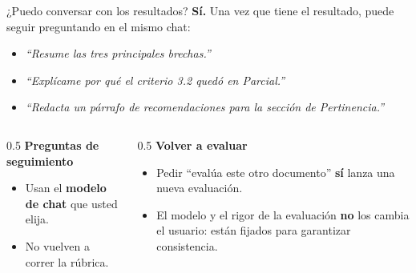 \documentclass[aspectratio=169,11pt]{beamer}
\newcommand{\redlead}[1]{\textbf{\color{iloRed}#1}}
\newcommand{\bluelead}[1]{\textbf{\color{iloBlue}#1}}
\begin{document}
\begin{frame}{¿Puedo conversar con los resultados?}
  \small
  \redlead{Sí.} Una vez que tiene el resultado, puede seguir preguntando en el mismo chat:
  \begin{itemize}
    \item \emph{``Resume las tres principales brechas.''}
    \item \emph{``Explícame por qué el criterio 3.2 quedó en Parcial.''}
    \item \emph{``Redacta un párrafo de recomendaciones para la sección de Pertinencia.''}
  \end{itemize}
  \vspace{0.2cm}
  \begin{columns}[T]
    \begin{column}{0.5\textwidth}
      \bluelead{Preguntas de seguimiento}
      \begin{itemize}
        \item Usan el \textbf{modelo de chat} que usted elija.
        \item No vuelven a correr la rúbrica.
      \end{itemize}
    \end{column}
    \begin{column}{0.5\textwidth}
      \redlead{Volver a evaluar}
      \begin{itemize}
        \item Pedir ``evalúa este otro documento'' \textbf{sí} lanza una nueva evaluación.
        \item El modelo y el rigor de la evaluación \textbf{no} los cambia el usuario: están fijados para garantizar consistencia.
      \end{itemize}
    \end{column}
  \end{columns}
\end{frame}
\end{document}
